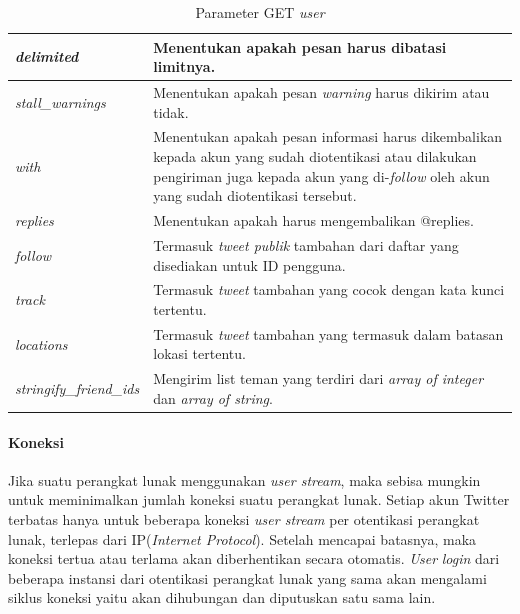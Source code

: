 \begin{table}[h]
\caption{Parameter GET \textit{user}}
\label{table:ParameterGetUser}
\begin{tabular}{|p{5cm}|p{9cm}|}
\hline
\textit{delimited}              & Menentukan apakah pesan harus dibatasi limitnya.																												\\ \hline
\textit{stall\_warnings}        & Menentukan apakah pesan \textit{warning} harus dikirim atau tidak.                                                               \\ \hline
\textit{with}                   & Menentukan apakah pesan informasi harus dikembalikan kepada akun yang sudah diotentikasi atau dilakukan pengiriman juga kepada akun yang di-\textit{follow} oleh akun yang sudah diotentikasi tersebut.\\ \hline
\textit{replies}                & Menentukan apakah harus mengembalikan @replies.                                                                             \\ \hline
\textit{follow}                 & Termasuk \textit{tweet publik} tambahan dari daftar yang disediakan untuk ID pengguna.														\\ \hline
\textit{track}                  & Termasuk \textit{tweet} tambahan yang cocok dengan kata kunci tertentu.     \\ \hline
\textit{locations}              & Termasuk \textit{tweet} tambahan yang termasuk dalam batasan lokasi tertentu.                                                      \\ \hline
\textit{stringify\_friend\_ids} & Mengirim list teman yang terdiri dari \textit{array of integer} dan \textit{array of string}.              \\ \hline            
\end{tabular}
\end{table}

\paragraph{Koneksi}
Jika suatu perangkat lunak menggunakan \textit{user stream}, maka sebisa mungkin untuk meminimalkan jumlah koneksi suatu perangkat lunak. Setiap akun Twitter terbatas hanya untuk beberapa koneksi \textit{user stream} per otentikasi perangkat lunak, terlepas dari IP(\textit{Internet Protocol}). Setelah mencapai batasnya, maka koneksi tertua atau terlama akan diberhentikan secara otomatis. \textit{User} \textit{login} dari beberapa instansi dari otentikasi perangkat lunak yang sama akan mengalami siklus koneksi yaitu akan dihubungan dan diputuskan satu sama lain.

